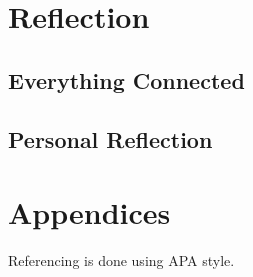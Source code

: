 \part{Reflection}

\chapter{Everything Connected}
\tbc

\chapter{Personal Reflection}
\tbc


\part{Appendices}

\tbc

\tbc

\tbc

\tbc

\tbc

\tbc

Referencing is done using APA style.



